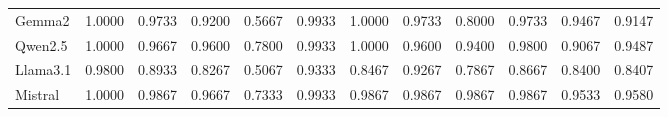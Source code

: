 \begin{table}[h!]
{\begin{tabular}{lcccccccccc||c}
            Gemma2                             & 1.0000                                                  & 0.9733                                                  & 0.9200                                                  & 0.5667                                                            & 0.9933                                                  & 1.0000                                                    & 0.9733                                                            & 0.8000                                                  & 0.9733                                 & 0.9467                                   & 0.9147 \\
            Qwen2.5                            & 1.0000                                                  & 0.9667                                                  & 0.9600                                                  & 0.7800                                                            & 0.9933                                                  & 1.0000                                                    & 0.9600                                                            & 0.9400                                                  & 0.9800                                 & 0.9067                                   & 0.9487 \\
            Llama3.1                           & 0.9800                                                  & 0.8933                                                  & 0.8267                                                  & 0.5067                                                            & 0.9333                                                  & 0.8467                                                    & 0.9267                                                            & 0.7867                                                  & 0.8667                                 & 0.8400                                   & 0.8407 \\
            Mistral                            & 1.0000                                                  & 0.9867                                                  & 0.9667                                                  & 0.7333                                                            & 0.9933                                                  & 0.9867                                                    & 0.9867                                                            & 0.9867                                                  & 0.9867                                 & 0.9533                                   & 0.9580 \\

\end{tabular}}
\end{table}

